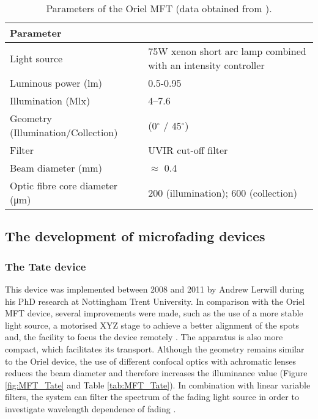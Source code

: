 \begin{table*}[!h]
\centering %
\caption[\hspace{0.3cm}Parameters of the Oriel MFT]{Parameters of the Oriel MFT (data obtained from \citet{whitmore_predicting_1999}).}
\begin{tabular}{R{5.5cm}L{7cm}}
\toprule[0.4mm]
\textbf{Parameter} &  \\\midrule
Light source & 75W xenon short arc lamp combined with an intensity controller\\
Luminous power (\unit{\lumen}) & 0.5-0.95\\
Illumination (\unit{\mega\lux}) & 4–7.6\\
Geometry (Illumination/Collection) & (0$^\circ$ / 45$^\circ$) \\
Filter & UVIR cut-off filter \\
Beam diameter (\unit{\mm}) & $\approx$ 0.4\\
Optic fibre core diameter (\unit{\um}) & 200 (illumination); 600 (collection) \\ \bottomrule[0.4mm]
\end{tabular}
\label{tab:MFT_oriel}
\end{table*}


\subsection{The development of microfading devices}


\subsubsection{The Tate device}

This device was implemented between 2008 and 2011 by Andrew Lerwill during his PhD research at Nottingham Trent University. In comparison with the Oriel MFT device, several improvements were made, such as the use of a more stable light source, a motorised XYZ stage to achieve a better alignment of the spots and, the facility to focus the device remotely \citep[25-6]{lerwill_micro-fading_2011}. The apparatus is also more compact, which facilitates its transport. Although the geometry remains similar to the Oriel device, the use of different confocal optics with achromatic lenses reduces the beam diameter and therefore increases the illuminance value (Figure \ref{fig:MFT_Tate} and Table \ref{tab:MFT_Tate}). In combination with linear variable filters, the system can filter the spectrum of the fading light source in order to investigate wavelength dependence of fading \citep{lerwill_micro-fading_2015}.

